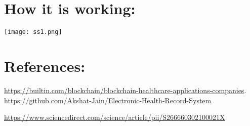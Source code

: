 \documentclass[12pt]{article}
\begin{document}
\vspace{10mm}
\section*{\large How it is working:}
\texttt{[image: ss1.png]}
\section*{\Huge References:}
\normalsize
\url{https://builtin.com/blockchain/blockchain-healthcare-applications-companies}.
\\
\vspace{3mm}
\url{https://github.com/Akshat-Jain/Electronic-Health-Record-System}
\\\vspace{3mm}

\url{https://www.sciencedirect.com/science/article/pii/S266660302100021X}

	
	





 
\end{document}
